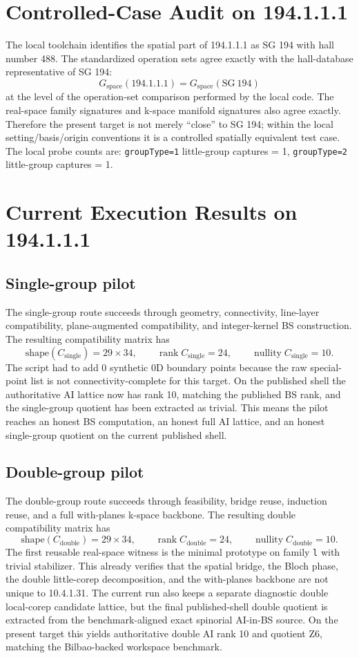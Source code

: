 \documentclass[11pt]{article}
\begin{document}
\section{Controlled-Case Audit on 194.1.1.1}
The local toolchain identifies the spatial part of 194.1.1.1 as SG 194 with hall number 488. The standardized operation sets agree exactly with the hall-database representative of SG 194:
\[
G_{\mathrm{space}}(194.1.1.1) = G_{\mathrm{space}}(\mathrm{SG}\ 194)
\]
at the level of the operation-set comparison performed by the local code. The real-space family signatures and k-space manifold signatures also agree exactly. Therefore the present target is not merely ``close'' to SG 194; within the local setting/basis/origin conventions it is a controlled spatially equivalent test case. The local probe counts are: \texttt{groupType=1} little-group captures = 1, \texttt{groupType=2} little-group captures = 1.

\section{Current Execution Results on 194.1.1.1}
\subsection*{Single-group pilot}
The single-group route succeeds through geometry, connectivity, line-layer compatibility, plane-augmented compatibility, and integer-kernel BS construction. The resulting compatibility matrix has
\[
\mathrm{shape}(C_{\mathrm{single}}) = 29 \times 34, \qquad
\operatorname{rank} C_{\mathrm{single}} = 24, \qquad
\operatorname{nullity} C_{\mathrm{single}} = 10.
\]
The script had to add 0 synthetic 0D boundary points because the raw special-point list is not connectivity-complete for this target. On the published shell the authoritative AI lattice now has rank 10, matching the published BS rank, and the single-group quotient has been extracted as trivial. This means the pilot reaches an honest BS computation, an honest full AI lattice, and an honest single-group quotient on the current published shell.

\subsection*{Double-group pilot}
The double-group route succeeds through feasibility, bridge reuse, induction reuse, and a full with-planes k-space backbone. The resulting double compatibility matrix has
\[
\mathrm{shape}(C_{\mathrm{double}}) = 29 \times 34, \qquad
\operatorname{rank} C_{\mathrm{double}} = 24, \qquad
\operatorname{nullity} C_{\mathrm{double}} = 10.
\]
The first reusable real-space witness is the minimal prototype on family \texttt{l} with trivial stabilizer. This already verifies that the spatial bridge, the Bloch phase, the double little-corep decomposition, and the with-planes backbone are not unique to 10.4.1.31. The current run also keeps a separate diagnostic double local-corep candidate lattice, but the final published-shell double quotient is extracted from the benchmark-aligned exact spinorial AI-in-BS source. On the present target this yields authoritative double AI rank 10 and quotient Z6, matching the Bilbao-backed workspace benchmark.
\end{document}

